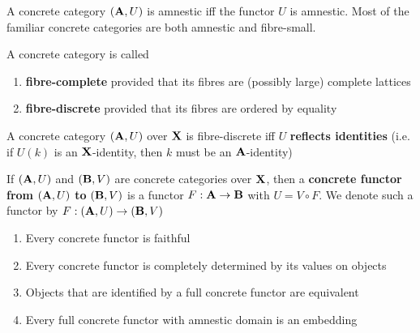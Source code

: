 \documentclass[11pt]{article}
\begin{document}
\begin{remark}
A concrete category \((\operatorname{\textbf{A}},U)\) is amnestic iff the functor \(U\) is
amnestic. Most of the familiar concrete categories are both amnestic and
fibre-small. 
\end{remark}

\begin{definition}[]
A concrete category is called
\begin{enumerate}
\item \textbf{fibre-complete} provided that its fibres are (possibly large) complete lattices
\item \textbf{fibre-discrete} provided that its fibres are ordered by equality
\end{enumerate}
\end{definition}

\begin{proposition}[]
A concrete category \((\operatorname{\textbf{A}},U)\) over \(\operatorname{\textbf{X}}\) is fibre-discrete iff \(U\)
\textbf{reflects identities} (i.e. if \(U(k)\) is an \(\operatorname{\textbf{X}}\)-identity, then \(k\) must
be an \(\operatorname{\textbf{A}}\)-identity)
\end{proposition}

\begin{definition}[]
If \((\operatorname{\textbf{A}},U)\) and \((\operatorname{\textbf{B}},V)\) are concrete categories over \(\operatorname{\textbf{X}}\), then a
\textbf{concrete functor from} \((\operatorname{\textbf{A}},U)\) \textbf{to} \((\operatorname{\textbf{B}},V)\) is a functor \(F:\operatorname{\textbf{A}}\to\operatorname{\textbf{B}}\)
with \(U=V\circ F\). We denote such a functor by \(F:(\operatorname{\textbf{A}},U)\to(\operatorname{\textbf{B}},V)\)
\end{definition}

\begin{proposition}[]
\begin{enumerate}
\item Every concrete functor is faithful
\item Every concrete functor is completely determined by its values on objects
\item Objects that are identified by a full concrete functor are equivalent
\item Every full concrete functor with amnestic domain is an embedding
\end{enumerate}
\end{proposition}
\end{document}

